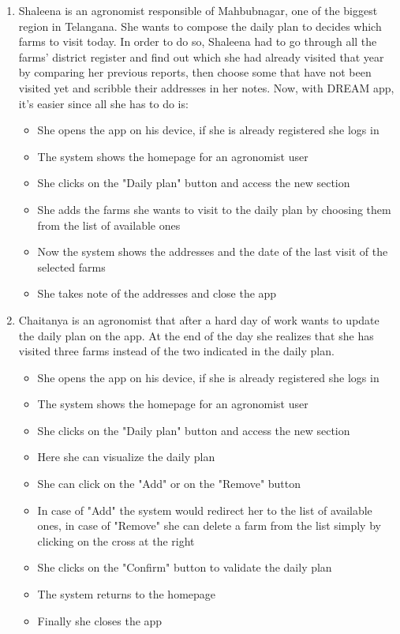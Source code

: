\documentclass[table, 12pt]{article}
\begin{document}
\begin{enumerate}
    \item Shaleena is an agronomist responsible of Mahbubnagar, one of the biggest region in Telangana. She wants to compose the daily plan to decides which farms to visit today.
    In order to do so, Shaleena had to go through all the farms' district register and find out which she had already visited that year by comparing her previous reports, then choose some that have not been visited yet and scribble their addresses in her notes.
    Now, with DREAM app, it's easier since all she has to do is:
    \begin{itemize}
        \item She opens the app on his device, if she is already registered she logs in
        \item The system shows the homepage for an agronomist user
        \item She clicks on the "Daily plan" button and access the new section
        \item She adds the farms she wants to visit to the daily plan by choosing them from the list of available ones
        \item Now the system shows the addresses and the date of the last visit of the selected farms
        \item She takes note of the addresses and close the app
    \end{itemize}
    \item Chaitanya is an agronomist that after a hard day of work wants to update the daily plan on the app.
    At the end of the day she realizes that she has visited three farms instead of the two indicated in the daily plan.
    \begin{itemize}
        \item She opens the app on his device, if she is already registered she logs in
        \item The system shows the homepage for an agronomist user
        \item She clicks on the "Daily plan" button and access the new section
        \item Here she can visualize the daily plan
        \item She can click on the "Add" or on the "Remove" button
        \item In case of "Add" the system would redirect her to the list of available ones, in case of "Remove" she can delete a farm 
        from the list simply by clicking on the cross at the right
        \item She clicks on the "Confirm" button to validate the daily plan
        \item The system returns to the homepage
        \item Finally she closes the app
    \end{itemize}
    

\end{enumerate}
\end{document}
